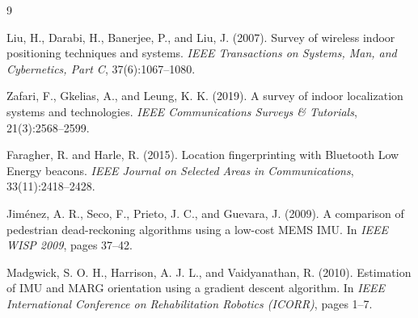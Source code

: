 \documentclass[12pt]{article}
\begin{document}

\begin{thebibliography}{9}

Liu, H., Darabi, H., Banerjee, P., and Liu, J. (2007).
Survey of wireless indoor positioning techniques and systems.
\textit{IEEE Transactions on Systems, Man, and Cybernetics, Part C},
37(6):1067--1080.

Zafari, F., Gkelias, A., and Leung, K. K. (2019).
A survey of indoor localization systems and technologies.
\textit{IEEE Communications Surveys \& Tutorials}, 21(3):2568--2599.

Faragher, R. and Harle, R. (2015).
Location fingerprinting with Bluetooth Low Energy beacons.
\textit{IEEE Journal on Selected Areas in Communications}, 33(11):2418--2428.

Jiménez, A. R., Seco, F., Prieto, J. C., and Guevara, J. (2009).
A comparison of pedestrian dead-reckoning algorithms using a low-cost MEMS IMU.
In \textit{IEEE WISP 2009}, pages 37--42.

Madgwick, S. O. H., Harrison, A. J. L., and Vaidyanathan, R. (2010).
Estimation of IMU and MARG orientation using a gradient descent algorithm.
In \textit{IEEE International Conference on Rehabilitation Robotics (ICORR)},
pages 1--7.

\end{thebibliography}
\end{document}
